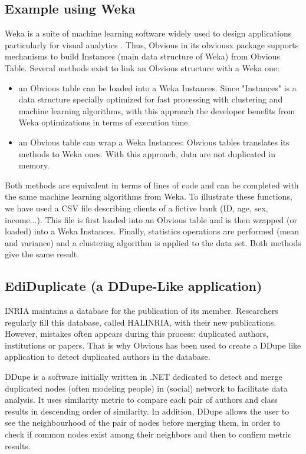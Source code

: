 \subsection{Example using Weka}

Weka \cite{Weka} is a suite of machine learning software widely used to design applications particularly for visual analytics . Thus, Obvious in its obviousx package supports mechanisms to build Instances (main data structure of Weka) from Obvious Table. Several methods exist to link an Obvious structure with a Weka one:

\begin{itemize}
\item an Obvious table can be loaded into a Weka Instances. Since "Instances" is a data structure specially optimized for fast processing with clustering and machine learning algorithms, with this approach the developer benefits from Weka optimizations in terms of execution time.
\item an Obvious table can wrap a Weka Instances: Obvious tables translates its methods to Weka ones. With this approach, data are not duplicated in memory.
\end{itemize}

Both methods are equivalent in terms of lines of code and can be completed with the same machine learning algorithms from Weka. To illustrate these functions, we have used a CSV file describing clients of a fictive bank (ID, age, sex, income...). This file is first loaded into an Obvious table and is then wrapped (or loaded) into a Weka Instances. Finally, statistics operations are performed (mean and variance) and a clustering algorithm is applied to the data set. Both methods give the same result.

\subsection{EdiDuplicate (a DDupe-Like application)}

INRIA maintains a database for the publication of its member. Researchers regularly fill this database, called HALINRIA, with their new publications. However, mistakes often appears during this process: duplicated authors, institutions or papers. That is why Obvious has been used
to create a DDupe like application to detect duplicated authors in the database.

DDupe is a software initially written in .NET dedicated to detect and merge duplicated nodes (often modeling people)  in (social) network to facilitate data analysis. It uses similarity metric to compare each pair  of authors and class results in descending order of similarity. In addition, DDupe allows the user to see the neighbourhood of the pair of nodes before merging them, in order to check if common nodes exist among their neighbors and then to confirm metric results.

